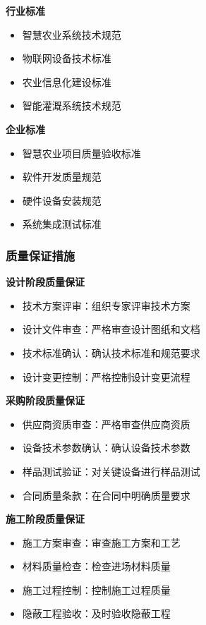 \documentclass[UTF8,a4paper,zihao=-4]{ctexart}
\begin{document}
\textbf{行业标准}
\begin{itemize}
    \item 智慧农业系统技术规范
    \item 物联网设备技术标准
    \item 农业信息化建设标准
    \item 智能灌溉系统技术规范
\end{itemize}

\textbf{企业标准}
\begin{itemize}
    \item 智慧农业项目质量验收标准
    \item 软件开发质量规范
    \item 硬件设备安装规范
    \item 系统集成测试标准
\end{itemize}

\subsubsection{质量保证措施}
\textbf{设计阶段质量保证}
\begin{itemize}
    \item 技术方案评审：组织专家评审技术方案
    \item 设计文件审查：严格审查设计图纸和文档
    \item 技术标准确认：确认技术标准和规范要求
    \item 设计变更控制：严格控制设计变更流程
\end{itemize}

\textbf{采购阶段质量保证}
\begin{itemize}
    \item 供应商资质审查：严格审查供应商资质
    \item 设备技术参数确认：确认设备技术参数
    \item 样品测试验证：对关键设备进行样品测试
    \item 合同质量条款：在合同中明确质量要求
\end{itemize}

\textbf{施工阶段质量保证}
\begin{itemize}
    \item 施工方案审查：审查施工方案和工艺
    \item 材料质量检查：检查进场材料质量
    \item 施工过程控制：控制施工过程质量
    \item 隐蔽工程验收：及时验收隐蔽工程
\end{itemize}
\end{document}
